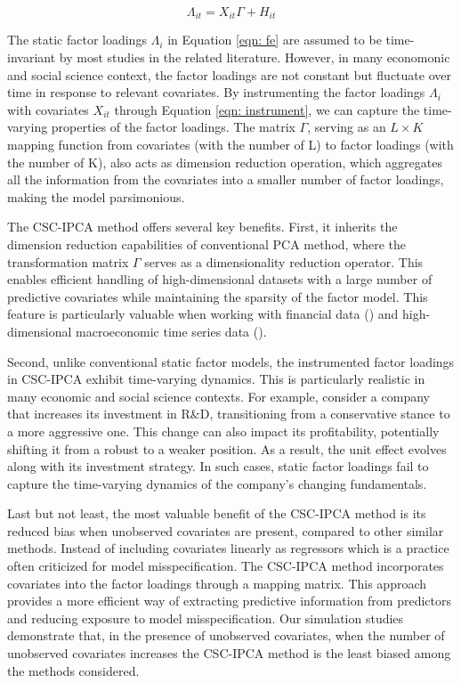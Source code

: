 \documentclass[12pt]{article}
\begin{document}
\begin{equation}
\label{eqn: instrument}
\Lambda_{it} = X_{it}\Gamma + H_{it}
\end{equation}

The static factor loadings $\Lambda_i$ in Equation \ref{eqn: fe} are assumed to be time-invariant by most studies in the related literature. However, in many economonic and social science context, the factor loadings are not constant but fluctuate over time in response to relevant covariates. By instrumenting the factor loadings $\Lambda_i$ with covariates $X_{it}$ through Equation \ref{eqn: instrument}, we can capture the time-varying properties of the factor loadings. The matrix $\Gamma$, serving as an $L \times K$ mapping function from covariates (with the number of L) to factor loadings (with the number of K), also acts as dimension reduction operation, which aggregates all the information from the covariates into a smaller number of factor loadings, making the model parsimonious.

The CSC-IPCA method offers several key benefits. First, it inherits the dimension reduction capabilities of conventional PCA method, where the transformation matrix $\Gamma$ serves as a dimensionality reduction operator. This enables efficient handling of high-dimensional datasets with a large number of predictive covariates while maintaining the sparsity of the factor model. This feature is particularly valuable when working with financial data (\cite{feng2020taming}) and high-dimensional macroeconomic time series data (\cite{brave2009chicago}).

Second, unlike conventional static factor models, the instrumented factor loadings in CSC-IPCA exhibit time-varying dynamics. This is particularly realistic in many economic and social science contexts. For example, consider a company that increases its investment in R\&D, transitioning from a conservative stance to a more aggressive one. This change can also impact its profitability, potentially shifting it from a robust to a weaker position. As a result, the unit effect evolves along with its investment strategy. In such cases, static factor loadings fail to capture the time-varying dynamics of the company's changing fundamentals.

Last but not least, the most valuable benefit of the CSC-IPCA method is its reduced bias when unobserved covariates are present, compared to other similar methods. Instead of including covariates linearly as regressors which is a practice often criticized for model misspecification. The CSC-IPCA method incorporates covariates into the factor loadings through a mapping matrix. This approach provides a more efficient way of extracting predictive information from predictors and reducing exposure to model misspecification. Our simulation studies demonstrate that, in the presence of unobserved covariates, when the number of unobserved covariates increases the CSC-IPCA method is the least biased among the methods considered.
\end{document}
